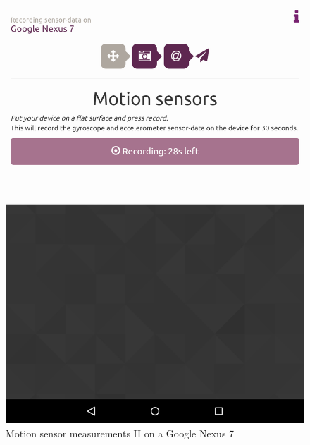 \begin{figure}[H]
\begin{minipage}[c]{.23\textwidth}
    \includegraphics[scale=0.15]{img/sensorrec-nexus-1-rec}
  \end{minipage}
  \caption{Motion sensor measurements II on a Google Nexus 7}
  \label{fig:sensorrec}
\end{figure}

